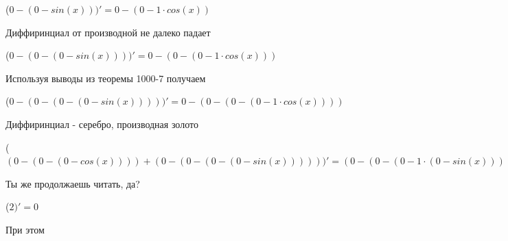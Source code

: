 \documentclass[12pt,a4paper,fleqn]{article}
\begin{document}
\begin{center}
\begin{center}
\begin{center}
\begin{center}
\begin{center}
\begin{center}
\begin{center}
\begin{center}
\begin{center}
\begin{center}
\begin{center}
\begin{center}
\begin{center}
\begin{center}
\begin{center}
\begin{center}
\begin{center}
\begin{center}
\begin{center}
\begin{center}
\begin{center}
\begin{center}
\begin{center}
\begin{center}
\begin{center}
\begin{center}
\begin{center}
\begin{center}
\begin{center}
\begin{center}
\begin{center}
\begin{center}
\begin{center}
\begin{center}
\begin{center}
\begin{center}
\begin{center}
\begin{center}
\begin{center}
\begin{center}
\begin{center}
\begin{center}
\begin{center}
\begin{center}
\begin{center}
\begin{center}
\begin{center}
\begin{center}
\begin{center}
\begin{center}
\begin{center}
\begin{center}
\begin{center}
\begin{center}
\begin{center}
\begin{center}
\begin{center}
\begin{center}
\begin{center}
\begin{center}
\begin{center}
\begin{center}
\begin{center}
\begin{center}
\begin{center}
\begin{center}
\begin{center}
\begin{center}
 ($0-(0-sin(x)))'
  = 0-(0-1 \cdot cos(x))$\end{center}
Диффиринциал от производной не далеко падает\cite{link2}

\begin{center}
 ($0-(0-(0-sin(x))))'
  = 0-(0-(0-1 \cdot cos(x)))$\end{center}
Используя выводы из теоремы 1000-7 получаем

\begin{center}
 ($0-(0-(0-(0-sin(x)))))'
  = 0-(0-(0-(0-1 \cdot cos(x))))$\end{center}
Диффиринциал - серебро, производная золото\cite{link2}

\begin{center}
 ($(0-(0-(0-cos(x))))+(0-(0-(0-(0-sin(x))))))'
  = (0-(0-(0-1 \cdot (0-sin(x)))))+(0-(0-(0-(0-1 \cdot cos(x)))))$\end{center}
Ты же продолжаешь читать, да?

\begin{center}
 ($2)'
  = 0$\end{center}
При этом


\end{center}
\end{center}
\end{center}
\end{center}
\end{center}
\end{center}
\end{center}
\end{center}
\end{center}
\end{center}
\end{center}
\end{center}
\end{center}
\end{center}
\end{center}
\end{center}
\end{center}
\end{center}
\end{center}
\end{center}
\end{center}
\end{center}
\end{center}
\end{center}
\end{center}
\end{center}
\end{center}
\end{center}
\end{center}
\end{center}
\end{center}
\end{center}
\end{center}
\end{center}
\end{center}
\end{center}
\end{center}
\end{center}
\end{center}
\end{center}
\end{center}
\end{center}
\end{center}
\end{center}
\end{center}
\end{center}
\end{center}
\end{center}
\end{center}
\end{center}
\end{center}
\end{center}
\end{center}
\end{center}
\end{center}
\end{center}
\end{center}
\end{center}
\end{center}
\end{center}
\end{center}
\end{center}
\end{center}
\end{center}
\end{center}
\end{center}
\end{center}
\end{document}
